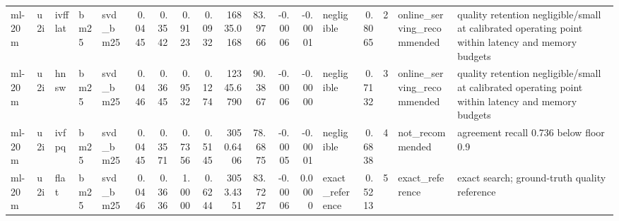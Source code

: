 \begin{tabular}{lllllrrrrrrrrlrrll}
ml-20m & u2i & ivfflat & bm25 & svd_bm25 & 0.0445 & 0.3542 & 0.9123 & 0.0932 & 16835.0168 & 83.9766 & -0.0006 & -0.0001 & negligible & 0.8065 & 2 & online_serving_recommended & quality retention negligible/small at calibrated operating point within latency and memory budgets \\
ml-20m & u2i & hnsw & bm25 & svd_bm25 & 0.0446 & 0.3645 & 0.9532 & 0.1274 & 12345.6790 & 90.3867 & -0.0006 & -0.0000 & negligible & 0.7132 & 3 & online_serving_recommended & quality retention negligible/small at calibrated operating point within latency and memory budgets \\
ml-20m & u2i & ivfpq & bm25 & svd_bm25 & 0.0445 & 0.3571 & 0.7356 & 0.5145 & 3050.6406 & 78.6875 & -0.0005 & -0.0001 & negligible & 0.6838 & 4 & not_recommended & agreement recall 0.736 below floor 0.9 \\
ml-20m & u2i & flat & bm25 & svd_bm25 & 0.0446 & 0.3636 & 1.0000 & 0.6244 & 3053.4351 & 83.7227 & -0.0006 & 0.0000 & exact_reference & 0.5213 & 5 & exact_reference & exact search; ground-truth quality reference \\
\bottomrule
\end{tabular}
